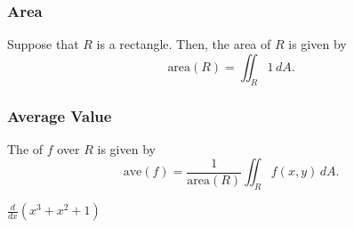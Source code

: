 \subsubsection{Area}
Suppose that \(R\) is a rectangle. Then, the area of \(R\) is given by
\[
\text{area}(R) = \iint_R 1 \, dA.
\]

\subsubsection{Average Value}

The  of \(f\) over \(R\) is given by
\[
\text{ave}(f) = \frac{1}{\text{area}(R)} \iint_R f(x, y) \, dA.
\]


\(\frac{d}{dx}(x^{3} + x^{2} + 1)\)